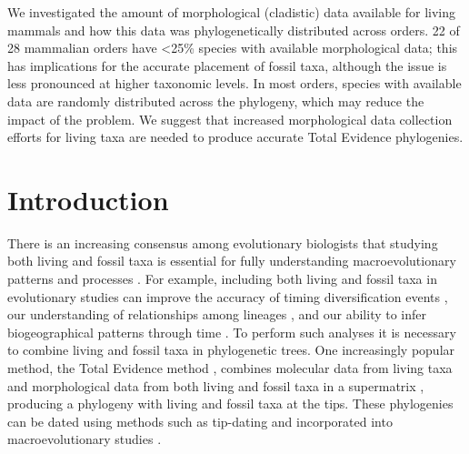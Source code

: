 We investigated the amount of morphological (cladistic) data available for living mammals and how this data was phylogenetically distributed across orders.
22 of 28 mammalian orders have \textless 25\% species with available morphological data; this has implications for the accurate placement of fossil taxa, although the issue is less pronounced at higher taxonomic levels. 
In most orders, species with available data are randomly distributed across the phylogeny, which may reduce the impact of the problem.
We suggest that increased morphological data collection efforts for living taxa are needed to produce accurate Total Evidence phylogenies. 


\newpage

%
%
\newpage 
\section{Introduction}
There is an increasing consensus among evolutionary biologists that studying both living and fossil taxa is essential for fully understanding macroevolutionary patterns and processes \citep{slaterunifying2013,fritzdiversity2013,Wood01032013}.
For example, including both living and fossil taxa in evolutionary studies can improve the accuracy of timing diversification events \citep[e.g.][]{ronquista2012}, our understanding of relationships among lineages \citep[e.g.][]{beckancient2014}, and our ability to infer biogeographical patterns through time \citep[e.g.][]{Meseguer01032015}.
To perform such analyses it is necessary to combine living and fossil taxa in phylogenetic trees.
One increasingly popular method, the Total Evidence method \citep{eernissetaxonomic1993,ronquista2012}, combines molecular data from living taxa and morphological data from both living and fossil taxa in a supermatrix \citep[e.g.][]{pyrondivergence2011,ronquista2012,schragocombining2013,slaterunifying2013,beckancient2014,Meseguer01032015}, producing a phylogeny with living and fossil taxa at the tips. 
These phylogenies can be dated using methods such as tip-dating \citep{ronquista2012,Wood01032013} and incorporated into macroevolutionary studies \citep[e.g.][]{ronquista2012,Wood01032013,Slater2012MEE}.

